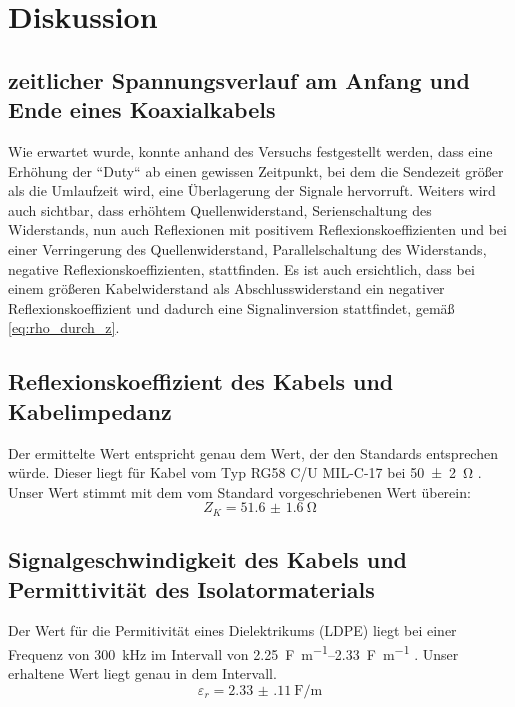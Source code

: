 \documentclass[11pt,ngerman]{scrartcl}
\begin{document}
\section{Diskussion}\label{disk}


\subsection{zeitlicher Spannungsverlauf am Anfang und Ende eines Koaxialkabels}

Wie erwartet wurde, konnte anhand des Versuchs festgestellt werden, dass eine
Erhöhung der ``Duty`` ab einen gewissen Zeitpunkt, bei dem die Sendezeit größer
als die Umlaufzeit wird, eine Überlagerung der Signale hervorruft. Weiters wird
auch sichtbar, dass erhöhtem Quellenwiderstand, Serienschaltung des
Widerstands, nun auch Reflexionen mit positivem Reflexionskoeffizienten und bei
einer Verringerung des Quellenwiderstand, Parallelschaltung des Widerstands,
negative Reflexionskoeffizienten, stattfinden. Es ist auch ersichtlich, dass
bei einem größeren Kabelwiderstand als Abschlusswiderstand ein negativer
Reflexionskoeffizient und dadurch eine Signalinversion stattfindet, gemäß
\autoref{eq:rho_durch_z}.


\subsection{Reflexionskoeffizient des Kabels und Kabelimpedanz}

Der ermittelte Wert entspricht  genau dem Wert, der den Standards entsprechen
würde. Dieser liegt für Kabel vom Typ RG58 C/U MIL-C-17 bei \SI{50(2)}{\ohm} \cite{standardkoaxial}.
Unser Wert stimmt mit dem vom Standard vorgeschriebenen Wert überein:
\begin{equation}
	Z_K = \SI{51.6(16)}{\ohm}
\end{equation}



\subsection{Signalgeschwindigkeit des Kabels und Permittivität des Isolatormaterials}

Der Wert für die Permitivität eines Dielektrikums (LDPE) liegt bei einer
Frequenz von \SI{300}{\kHz} im Intervall von
\SIrange{2.25}{2.33}{\farad\per\meter} \cite{permittivity}.  Unser erhaltene
Wert liegt genau in dem Intervall.
\begin{equation*}
	\varepsilon_r = \SI{2.33(11)}{\farad\per\meter}
\end{equation*}
\end{document}
